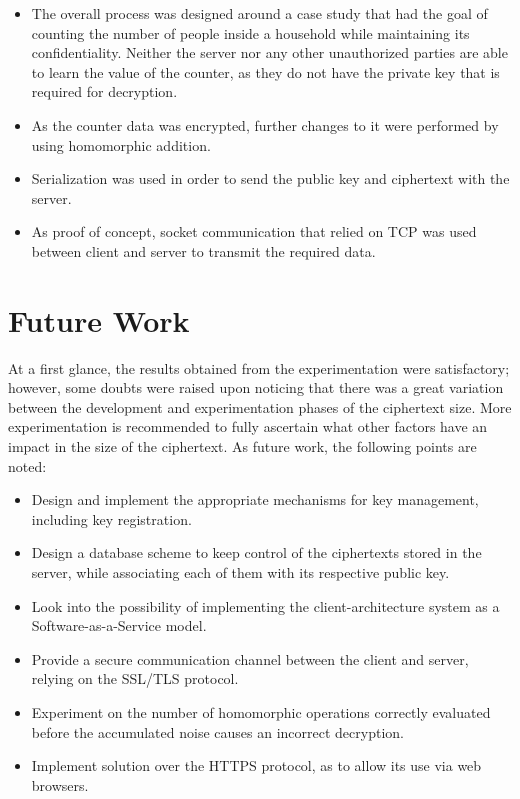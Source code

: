 \begin{itemize}
\item The overall process was designed around a case study that had the goal of counting the number of people inside a household while maintaining its confidentiality. Neither the server nor any other unauthorized parties are able to learn the value of the counter, as they do not have the private key that is required for decryption.
\item As the counter data was encrypted, further changes to it were performed by using homomorphic addition. 
\item Serialization was used in order to send the public key and ciphertext with the server.
\item As proof of concept, socket communication that relied on TCP was used between client and server to transmit the required data.
\end{itemize} 

\section{Future Work}
At a first glance, the results obtained from the experimentation were satisfactory; however, some doubts were raised upon noticing that there was a great variation between the development and experimentation phases of the ciphertext size. More experimentation is recommended to fully ascertain what other factors have an impact in the size of the ciphertext. As future work, the following points are noted:

\begin{itemize}
\item Design and implement the appropriate mechanisms for key management, including key registration.
\item Design a database scheme to keep control of the ciphertexts stored in the server, while associating each of them with its respective public key.
\item Look into the possibility of implementing the client-architecture system as a Software-as-a-Service model.
\item Provide a secure communication channel between the client and server, relying on the SSL/TLS protocol.
\item Experiment on the number of homomorphic operations correctly evaluated before the accumulated noise causes an incorrect decryption.
\item Implement solution over the HTTPS protocol, as to allow its use via web browsers.
\end{itemize}

\clearpage
